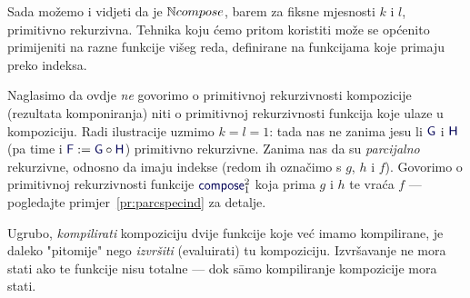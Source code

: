 
Sada možemo i vidjeti da je ${\mathbb N} compose$, barem za fiksne mjesnosti $k$ i $l$, primitivno rekurzivna. Tehnika koju ćemo pritom koristiti može se općenito primijeniti na razne funkcije višeg reda, definirane na funkcijama koje primaju preko indeksa.

Naglasimo da ovdje \emph{ne} govorimo o primitivnoj rekurzivnosti kompozicije (rezultata komponiranja) niti o primitivnoj rekurzivnosti funkcija koje ulaze u kompoziciju. Radi ilustracije uzmimo $k=l=1$: tada nas ne zanima jesu li $\f G$ i $\f H$ (pa time i $\f F:=\f G\circ\f H$) primitivno rekurzivne. Zanima nas da su \emph{parcijalno} rekurzivne, odnosno da imaju indekse (redom ih označimo s $g$, $h$ i $f$). Govorimo o primitivnoj rekurzivnosti funkcije $\f{compose}_1^2$ koja prima $g$ i $h$ te vraća $f$ --- pogledajte primjer~\ref{pr:parcspecind} za detalje.

Ugrubo, \emph{kompilirati} kompoziciju dvije funkcije koje već imamo kompilirane, je daleko "pitomije" nego \emph{izvršiti} (evaluirati) tu kompoziciju. Izvršavanje ne mora stati ako te funkcije nisu totalne --- dok s\=amo kompiliranje kompozicije mora stati.

